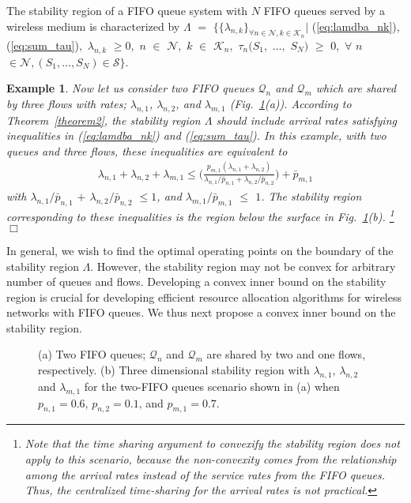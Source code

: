\documentclass[conference]{IEEEtran}
\newtheorem{example}{Example}
\newcommand{\Sset}{\mathcal{S}}
\newcommand{\Kset}{\mathcal{K}}
\newcommand{\Nset}{\mathcal{N}}
\newcommand{\Qset}{\mathcal{Q}}
\begin{document}
The stability region of a FIFO queue system with $N$ FIFO queues served by a wireless medium is characterized by $\Lambda$ $=$ $\{ \{\lambda_{n,k}\}_{\forall n \in \Nset, k \in \Kset_{n}} |$ (\ref{eq:lamdba_nk}), (\ref{eq:sum_tau})$,$ $\lambda_{n,k}$ $\geq 0,$ $n$ $\in$ $\Nset,$ $k$ $\in$ $\Kset_{n},$  $\tau_{n}(S_1,$ $\ldots,$ $S_N)$ $\geq$ $0,$ $\forall$ $n$ $\in \Nset, (S_1, \ldots, S_{N}) \in \Sset\}$.


\begin{example}
Now let us consider two FIFO queues $\Qset_{n}$ and $\Qset_{m}$ which are shared by three flows with rates; $\lambda_{n,1}$, $\lambda_{n,2}$, and $\lambda_{m,1}$ (Fig.~\ref{fig:two_queue}(a)). According to Theorem~\ref{theorem2}, the stability region $\Lambda$ should include arrival rates satisfying inequalities in (\ref{eq:lamdba_nk}) and (\ref{eq:sum_tau}). In this example, with two queues and three flows, these inequalities are equivalent to
\begin{align} \label{eq:two_queue_three_flows}
\lambda_{n,1} + \lambda_{n,2} + \lambda_{m,1} \leq  \bigr( \frac{p_{m,1}(\lambda_{n,1}+\lambda_{n,2})}{\lambda_{n,1}/\bar{p}_{n,1} + \lambda_{n,2}/\bar{p}_{n,2}} \bigl) + \bar{p}_{m,1}
\end{align} with $\lambda_{n,1}/\bar{p}_{n,1}$ $+$ $\lambda_{n,2}/\bar{p}_{n,2}$ $\leq 1$, and $\lambda_{m,1}/\bar{p}_{m,1}$ $\leq$ $1$. The stability region corresponding to these inequalities is the region below the surface  in Fig.~\ref{fig:two_queue}(b). \footnote{Note that the time sharing argument to convexify the stability region does not apply to this scenario, because the non-convexity comes from the relationship among the arrival rates instead of the service rates from the FIFO queues. Thus, the centralized time-sharing for the arrival rates is not practical.}
\hfill $\Box$
\end{example}

In general, we wish to find the optimal operating points on the boundary of the stability region $\Lambda$. However, the stability region may not be convex for arbitrary number of queues and flows. Developing a convex inner bound on the stability region is crucial for developing efficient resource allocation algorithms for wireless networks with FIFO queues. We thus next propose a convex inner bound on the stability region.

\begin{figure}
\vspace{-10pt}
\centering
{}
\vspace{-5pt}
\caption{(a) Two FIFO queues; $\Qset_{n}$ and $\Qset_{m}$ are shared by two and one flows, respectively. (b) Three dimensional stability region with $\lambda_{n,1}$, $\lambda_{n,2}$ and $\lambda_{m,1}$ for the two-FIFO queues scenario shown in (a) when $p_{n,1}=0.6$, $p_{n,2}=0.1$, and $p_{m,1}=0.7$.}
\label{fig:two_queue}
\vspace{-15pt}
\end{figure}
\end{document}
